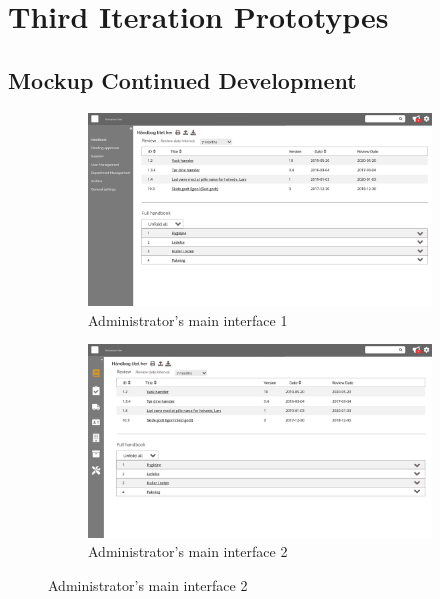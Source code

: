 \chapter{Third Iteration Prototypes} \label{chap:3-Prototypes}
\section{Mockup Continued Development}\label{sec:2Mock}
\begin{figure}[H]
	\centering
	\begin{subfigure}[b]{0.48\textwidth}
		\includegraphics[width=\textwidth]{billeder/iteration3Prototyper/Page_11.jpg}
		\caption{Administrator's main interface 1}
		\label{fig:5-Main1}
	\end{subfigure}
	\quad
	\begin{subfigure}[b]{0.48\textwidth}
		\includegraphics[width=\textwidth]{billeder/iteration3Prototyper/Page_13.jpg}
		\caption{Administrator's main interface 2}
		\label{fig:5-Main2}
	\end{subfigure}
\end{figure}
